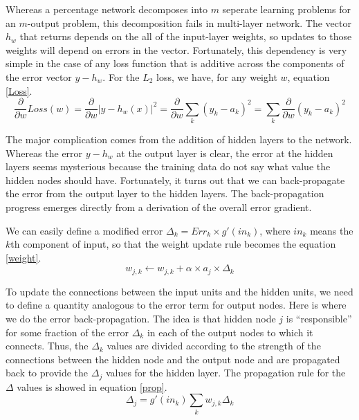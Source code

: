 \documentclass{mcmthesis}
\begin{document}
	Whereas a percentage network decomposes into $m$ seperate learning problems for an $m$-output problem, this decomposition fails in multi-layer network. The vector $h_{w}$ that returns depends on the all of the input-layer weights, so updates to those weights will depend on errors in the vector. Fortunately, this dependency is very simple in the case of any loss function that is additive across the components of the error vector $y-h_{w}$. For the $L_{2}$ loss, we have, for any weight $w$,  equation \ref{Loss}.
	\begin{equation}
	\label{Loss}
	   \frac{\partial }{\partial w}Loss\left ( w \right )=\frac{\partial }{\partial w}\left | y-h_{w}\left ( x \right ) \right |^{2}
   =\frac{\partial }{\partial w}\sum_{k}\left ( y_{k}-a_{k} \right )^{2}=\sum_{k}\frac{\partial }{\partial w}\left ( y_{k}-a_{k} \right )^{2} 
	\end{equation}

	The major complication comes from the addition of hidden layers to the network. Whereas the error ${y-h_{w}}$ at the output layer is clear, the error at the hidden layers seems mysterious because the training data do not say what value the hidden nodes should have. Fortunately, it turns out that we can back-propagate the error from the output layer to the hidden layers. The back-propagation progress emerges directly from a derivation of the overall error gradient.
	
	We can easily define a modified error $\Delta _{k}=Err _{k}\times g{}'\left ( in_{k} \right )$, where $in_{k}$ means the $k$th component of input, so that the weight update rule becomes the equation \ref{weight}.
	\begin{equation}
       \label{weight}
	    w_{j,k}\leftarrow w_{j,k}+\alpha \times a_{j} \times\Delta _{k}
	\end{equation}
	
	To update the connections between the input units and the hidden units, we need to define a quantity analogous to the error term for output nodes. Here is where we do the error back-propagation. The idea is that hidden node $j$ is ``responsible'' for some fraction of the error $\Delta _{k}$ in each of the output nodes to which it connects. Thus, the $\Delta _{k}$ values are divided according to the strength of the connections between the hidden node and the output node and are propagated back to provide the $\Delta_{j}$ values for the hidden layer. The propagation rule for the $\Delta$ values is showed in equation \ref{prop}.
	\begin{equation}
        \label{prop}
	    \Delta_{j} = g{}'\left ( in_{k} \right)\sum_{k}w_{j,k}\Delta_{k}
	\end{equation}
\end{document}
